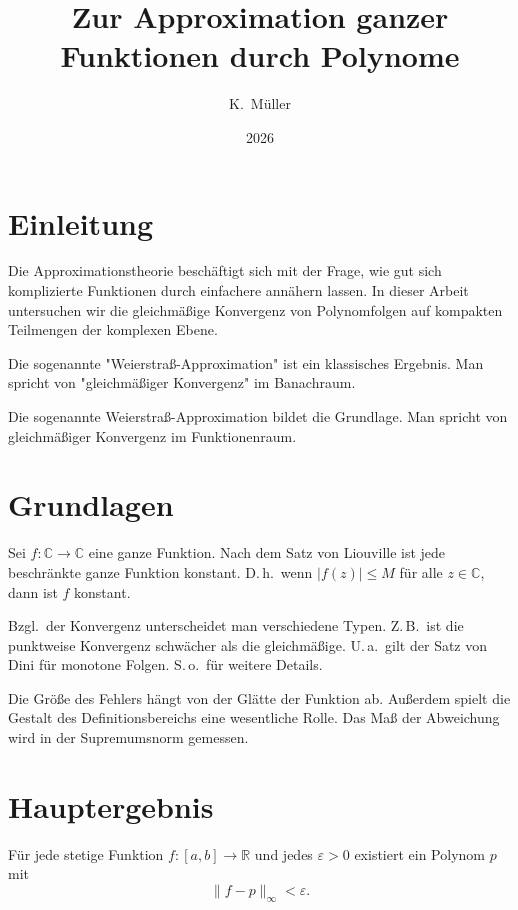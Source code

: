 \documentclass{article}
\title{Zur Approximation ganzer Funktionen durch Polynome}
\author{K.~M\"uller}
\date{2026}
\begin{document}
\maketitle

\section{Einleitung}

Die Approximationstheorie besch\"aftigt sich mit der Frage, wie gut sich
komplizierte Funktionen durch einfachere ann\"ahern lassen.  In dieser Arbeit
untersuchen wir die gleichm\"a\ss{}ige Konvergenz von Polynomfolgen auf
kompakten Teilmengen der komplexen Ebene.

Die sogenannte "Weierstra\ss-Approximation" ist ein klassisches Ergebnis.
Man spricht von "gleichm\"a\ss{}iger Konvergenz" im Banachraum.

Die sogenannte \glqq Weierstra\ss-Approximation\grqq{} bildet die Grundlage.
Man spricht von \glqq gleichm\"a\ss{}iger Konvergenz\grqq{} im Funktionenraum.

\section{Grundlagen}

Sei $f \colon \mathbb{C} \to \mathbb{C}$ eine ganze Funktion.  Nach dem Satz
von Liouville ist jede beschr\"ankte ganze Funktion konstant.  D.\,h.\ wenn
$|f(z)| \le M$ f\"ur alle $z \in \mathbb{C}$, dann ist $f$ konstant.

Bzgl.\ der Konvergenz unterscheidet man verschiedene Typen.  Z.\,B.\ ist die
punktweise Konvergenz schw\"acher als die gleichm\"a\ss{}ige.  U.\,a.\ gilt
der Satz von Dini f\"ur monotone Folgen.  S.\,o.\ f\"ur weitere Details.

Die Gr\"o\ss{}e des Fehlers h\"angt von der Gl\"atte der Funktion ab.  Au\ss{}erdem
spielt die Gestalt des Definitionsbereichs eine wesentliche Rolle.  Das Ma\ss{}
der Abweichung wird in der Supremumsnorm gemessen.

\section{Hauptergebnis}

\begin{theorem}
F\"ur jede stetige Funktion $f \colon [a,b] \to \mathbb{R}$ und jedes
$\varepsilon > 0$ existiert ein Polynom $p$ mit
\[
  \|f - p\|_\infty < \varepsilon.
\]
\end{theorem}
\end{document}
